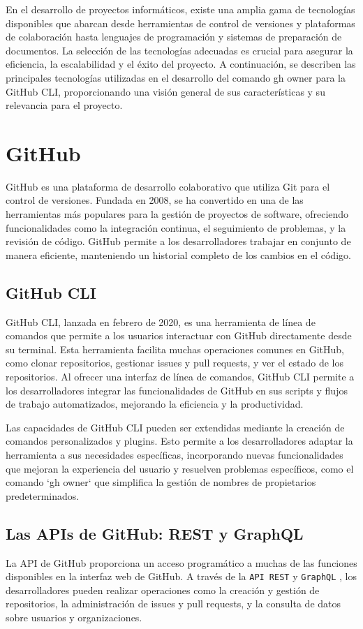En el desarrollo de proyectos informáticos, existe una amplia gama de tecnologías disponibles que abarcan desde herramientas de control de versiones y plataformas de colaboración hasta lenguajes de programación y sistemas de preparación de documentos. La selección de las tecnologías adecuadas es crucial para asegurar la eficiencia, la escalabilidad y el éxito del proyecto. A continuación, se describen las principales tecnologías utilizadas en el desarrollo del comando gh owner para la GitHub CLI, proporcionando una visión general de sus características y su relevancia para el proyecto.

\section{GitHub}
GitHub es una plataforma de desarrollo colaborativo que utiliza Git para el control de versiones. Fundada en 2008, se ha convertido en una de las herramientas más populares para la gestión de proyectos de software, ofreciendo funcionalidades como la integración continua, el seguimiento de problemas, y la revisión de código. GitHub permite a los desarrolladores trabajar en conjunto de manera eficiente, manteniendo un historial completo de los cambios en el código.

\subsection{GitHub CLI} 
GitHub CLI, lanzada en febrero de 2020, es una herramienta de línea de comandos que permite a los usuarios interactuar con GitHub directamente desde su terminal. Esta herramienta facilita muchas operaciones comunes en GitHub, como clonar repositorios, gestionar issues y pull requests, y ver el estado de los repositorios. Al ofrecer una interfaz de línea de comandos, GitHub CLI permite a los desarrolladores integrar las funcionalidades de GitHub en sus scripts y flujos de trabajo automatizados, mejorando la eficiencia y la productividad.

Las capacidades de GitHub CLI pueden ser extendidas mediante la creación de comandos personalizados y plugins. Esto permite a los desarrolladores adaptar la herramienta a sus necesidades específicas, incorporando nuevas funcionalidades que mejoran la experiencia del usuario y resuelven problemas específicos, como el comando `gh owner` que simplifica la gestión de nombres de propietarios predeterminados.

\subsection{Las APIs de GitHub: REST y  GraphQL}
La API de GitHub proporciona un acceso programático a muchas de las funciones disponibles en la interfaz web de GitHub. A través de la \verb|API REST| \cite{rest-api} y \verb|GraphQL| \cite{graphql-api}, los desarrolladores pueden realizar operaciones como la creación y gestión de repositorios, la administración de issues y pull requests, y la consulta de datos sobre usuarios y organizaciones.

